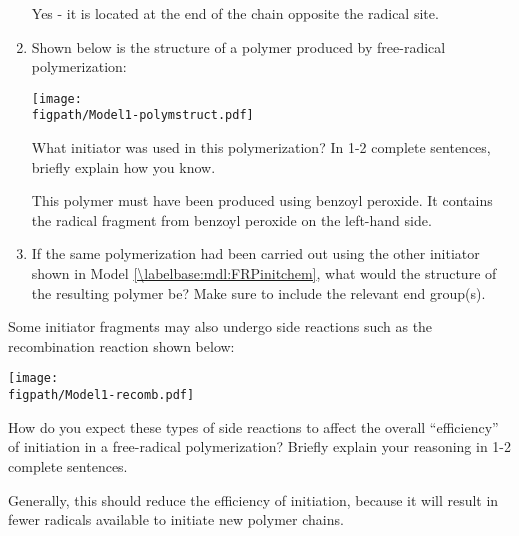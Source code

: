 \begin{activity}
\begin{ctqs}
\begin{enumerate}
				\begin{solution}[1in]
					Yes - it is located at the end of the chain opposite the radical site.
				\end{solution}
			
			 \item Shown below is the structure of a polymer produced by free-radical polymerization:
	
			\centerline{\texttt{[image: \\figpath/Model1-polymstruct.pdf]}}
	
			What initiator was used in this polymerization?  In 1-2 complete sentences, briefly explain how you know.
	
				\begin{solution}[1.75in]
					This polymer must have been produced using benzoyl peroxide.  It contains the radical fragment from benzoyl peroxide on the left-hand side.
				\end{solution}
			
			\item If the same polymerization had been carried out using the other initiator shown in Model \ref{\labelbase:mdl:FRPinitchem}, what would the structure of the resulting polymer be?  Make sure to include the relevant end group(s).
	
				\begin{solution}[1.75in]\end{solution}
				
		\end{enumerate}
		
	\question Some initiator fragments may also undergo side reactions such as the recombination reaction shown below:
	
			\centerline{\texttt{[image: \\figpath/Model1-recomb.pdf]}}
			
				How do you expect these types of side reactions to affect the overall ``efficiency'' of initiation in a free-radical polymerization? Briefly explain your reasoning in 1-2 complete sentences.
	
				\begin{solution}[1.25in]
					Generally, this should reduce the efficiency of initiation, because it will result in fewer radicals available to initiate new polymer chains.
					

\end{solution}
\end{ctqs}
\end{activity}
